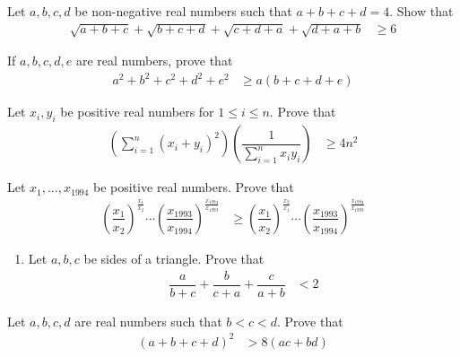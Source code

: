 \documentclass{subfile}
\begin{document}
		\begin{problem}
			Let $a,b,c,d$ be non-negative real numbers such that $a+b+c+d=4$. Show that
				\begin{align*}
					\sqrt{a+b+c}+\sqrt{b+c+d}+\sqrt{c+d+a}+\sqrt{d+a+b}
						& \geq 6
				\end{align*}
		\end{problem}
	
		\begin{problem}
			If $a,b,c,d,e$ are real numbers, prove that
				\begin{align*}
					a^{2}+b^{2}+c^{2}+d^{2}+e^{2}
						& \geq a(b+c+d+e)
				\end{align*}
		\end{problem}
	
		\begin{problem}
			Let $x_{i},y_{i}$ be positive real numbers for $1\leq i\leq n$. Prove that
				\begin{align*}
					\left(\sum_{i=1}^{n}(x_{i}+y_{i})^{2}\right)\left(\dfrac{1}{\sum_{i=1}^{n}x_{i}y_{i}}\right)
						& \geq 4n^{2}
				\end{align*}
		\end{problem}
	
		\begin{problem}
			Let $x_{1},\ldots,x_{1994}$ be positive real numbers. Prove that
				\begin{align*}
					\left(\dfrac{x_{1}}{x_{2}}\right)^{\frac{x_{1}}{x_{2}}}\cdots\left(\dfrac{x_{1993}}{x_{1994}}\right)^{\frac{x_{1994}}{x_{1993}}}
						& \geq \left(\dfrac{x_{1}}{x_{2}}\right)^{\frac{x_{2}}{x_{1}}}\cdots\left(\dfrac{x_{1993}}{x_{1994}}\right)^{\frac{x_{1994}}{x_{1993}}}
				\end{align*}
		\end{problem}
	
		\begin{problem}
			\begin{enumerate}[1.]
				\item Let $a,b,c$ be sides of a triangle. Prove that
					\begin{align*}
						\dfrac{a}{b+c}+\dfrac{b}{c+a}+\dfrac{c}{a+b}
							& < 2
					\end{align*}
			\end{enumerate}
		\end{problem}
	
		\begin{problem}
			Let $a,b,c,d$ are real numbers such that $b<c<d$. Prove that
				\begin{align*}
					(a+b+c+d)^{2}
						& > 8(ac+bd)
				\end{align*}
		\end{problem}
\end{document}
